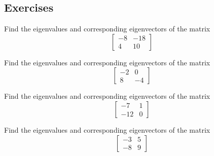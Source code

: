 \subsection{Exercises}
\begin{exercise}\ansMark%
Find the eigenvalues and corresponding eigenvectors of the matrix 
\[ \begin{bmatrix} -8 & -18 \\ 4 & 10 \end{bmatrix} \]
\end{exercise}

\begin{exercise}\ansMark%
Find the eigenvalues and corresponding eigenvectors of the matrix 
\[ \begin{bmatrix} -2 & 0 \\ 8 & -4 \end{bmatrix} \]
\end{exercise}

\begin{exercise}\ansMark%
Find the eigenvalues and corresponding eigenvectors of the matrix 
\[ \begin{bmatrix} -7 & 1 \\ -12 & 0 \end{bmatrix} \]
\end{exercise}

\begin{exercise}\ansMark%
Find the eigenvalues and corresponding eigenvectors of the matrix 
\[ \begin{bmatrix} -3 & 5 \\ -8 & 9 \end{bmatrix} \]
\end{exercise}

